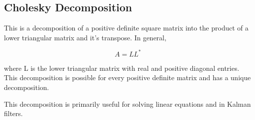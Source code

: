 \subsection{Cholesky Decomposition}

This is a decomposition of a positive definite square matrix into the product of a lower triangular matrix and it's transpose. In general,

\begin{equation}
    A = LL^*
\end{equation}

where L is the lower triangular matrix with real and positive diagonal entries. This decomposition is possible for every positive definite matrix and has a unique decomposition.

This decomposition is primarily useful for solving linear equations and in Kalman filters.
